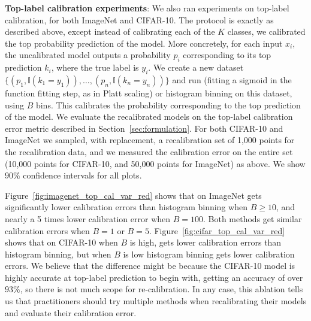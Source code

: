 \textbf{Top-label calibration experiments}: We also ran experiments on top-label calibration, for both ImageNet and CIFAR-10. The protocol is exactly as described above, except instead of calibrating each of the $K$ classes, we calibrated the top probability prediction of the model. More concretely, for each input $x_i$, the uncalibrated model outputs a probability $p_i$ corresponding to its top prediction $k_i$, where the true label is $y_i$. We create a new dataset $\{(p_1, \mathbb{I}(k_1 = y_1)), \dots, (p_n, \mathbb{I}(k_n = y_n))\}$ and run \ourcal{} (fitting a sigmoid in the function fitting step, as in Platt scaling) or histogram binning on this dataset, using $B$ bins. This calibrates the probability corresponding to the top prediction of the model. We evaluate the recalibrated models on the top-label calibration error metric described in Section~\ref{sec:formulation}. For both CIFAR-10 and ImageNet we sampled, with replacement, a recalibration set of 1,000 points for the recalibration data, and we measured the calibration error on the entire set (10,000 points for CIFAR-10, and 50,000 points for ImageNet) as above. We show $90\%$ confidence intervals for all plots.

Figure~\ref{fig:imagenet_top_cal_var_red} shows that on ImageNet \ourcal{} gets significantly lower calibration errors than histogram binning when $B \geq 10$, and nearly a 5 times lower calibration error when $B = 100$. Both methods get similar calibration errors when $B = 1$ or $B = 5$. Figure~\ref{fig:cifar_top_cal_var_red} shows that on CIFAR-10 when $B$ is high, \ourcal{} gets lower calibration errors than histogram binning, but when $B$ is low histogram binning gets lower calibration errors. We believe that the difference might be because the CIFAR-10 model is highly accurate at top-label prediction to begin with, getting an accuracy of over $93\%$, so there is not much scope for re-calibration. In any case, this ablation tells us that practitioners should try multiple methods when recalibrating their models and evaluate their calibration error.

